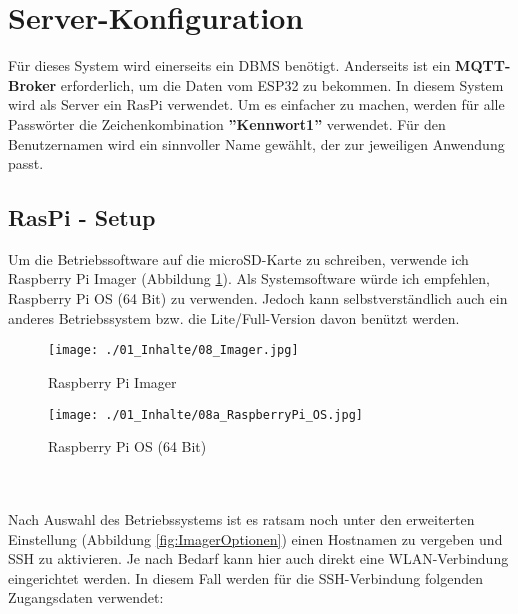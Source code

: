 
\section{Server-Konfiguration}
Für dieses System wird einerseits ein \ac{DBMS} benötigt. Anderseits ist ein \textbf{MQTT-Broker} erforderlich, um die Daten vom ESP32 zu bekommen. In diesem System wird als Server ein \ac{RasPi} verwendet. Um es einfacher zu machen, werden für alle Passwörter die Zeichenkombination \textbf{''Kennwort1''} verwendet. Für den Benutzernamen wird ein sinnvoller Name gewählt, der zur jeweiligen Anwendung passt.

\begin{comment}
	\begin{figure}[H]
		\texttt{[image: ./01\_Inhalte/07\_RaspberryPi.jpg]}
		\centering
		\caption{\acl{RasPi} 4}
	\end{figure}
\end{comment}

\subsection{\acl{RasPi} - Setup}
Um die Betriebssoftware auf die microSD-Karte zu schreiben, verwende ich Raspberry Pi Imager (Abbildung \ref{fig:RaspberryPiImager}). Als Systemsoftware würde ich empfehlen, Raspberry Pi OS (64 Bit) zu verwenden. Jedoch kann selbstverständlich auch ein anderes Betriebssystem bzw. die Lite/Full-Version davon benützt werden.

\begin{minipage}{0.5\textwidth}
	\begin{figure}[H]
		\texttt{[image: ./01\_Inhalte/08\_Imager.jpg]}
		\centering
		\caption{Raspberry Pi Imager}
		\label{fig:RaspberryPiImager}
	\end{figure}
\end{minipage}%
\begin{minipage}{0.5\textwidth}		
	\begin{figure}[H]
		\texttt{[image: ./01\_Inhalte/08a\_RaspberryPi\_OS.jpg]}
		\centering
		\caption{Raspberry Pi OS (64 Bit)}
		\label{fig:RaspberryPiOS}
	\end{figure}
\end{minipage}	
\\ \\
Nach Auswahl des Betriebssystems ist es ratsam noch unter den erweiterten Einstellung (Abbildung \ref{fig:ImagerOptionen}) einen Hostnamen zu vergeben und SSH zu aktivieren. Je nach Bedarf kann hier auch direkt eine WLAN-Verbindung eingerichtet werden. In diesem Fall werden für die SSH-Verbindung folgenden Zugangsdaten verwendet:


